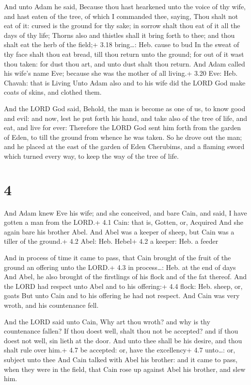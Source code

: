  And unto Adam he said, Because thou hast hearkened unto
the voice of thy wife, and hast eaten of the tree, of which I commanded
thee, saying, Thou shalt not eat of it: cursed is the ground for thy
sake; in sorrow shalt thou eat of it all the days of thy life;
 Thorns also and thistles shall it bring forth to thee; and
thou shalt eat the herb of the field;+ 3.18 bring\ldots: Heb. cause to
bud  In the sweat of thy face shalt thou eat bread, till
thou return unto the ground; for out of it wast thou taken: for dust
thou art, and unto dust shalt thou return.  And Adam called
his wife's name Eve; because she was the mother of all living.+ 3.20
Eve: Heb. Chavah: that is Living  Unto Adam also and to his
wife did the LORD God make coats of skins, and clothed them.

 And the LORD God said, Behold, the man is become as one
of us, to know good and evil: and now, lest he put forth his hand, and
take also of the tree of life, and eat, and live for ever: 
Therefore the LORD God sent him forth from the garden of Eden, to till
the ground from whence he was taken.  So he drove out the
man; and he placed at the east of the garden of Eden Cherubims, and a
flaming sword which turned every way, to keep the way of the tree of
life.

\hypertarget{section-3}{%
\section{4}\label{section-3}}

 And Adam knew Eve his wife; and she conceived, and bare
Cain, and said, I have gotten a man from the LORD.+ 4.1 Cain: that is,
Gotten, or, Acquired  And she again bare his brother Abel.
And Abel was a keeper of sheep, but Cain was a tiller of the ground.+
4.2 Abel: Heb. Hebel+ 4.2 a keeper: Heb. a feeder

 And in process of time it came to pass, that Cain brought
of the fruit of the ground an offering unto the LORD.+ 4.3 in
process\ldots: Heb. at the end of days  And Abel, he also
brought of the firstlings of his flock and of the fat thereof. And the
LORD had respect unto Abel and to his offering:+ 4.4 flock: Heb. sheep,
or, goats  But unto Cain and to his offering he had not
respect. And Cain was very wroth, and his countenance fell.

 And the LORD said unto Cain, Why art thou wroth? and why is
thy countenance fallen?  If thou doest well, shalt thou not
be accepted? and if thou doest not well, sin lieth at the door. And unto
thee shall be his desire, and thou shalt rule over him.+ 4.7 be
accepted: or, have the excellency+ 4.7 unto\ldots: or, subject unto thee
 And Cain talked with Abel his brother: and it came to pass,
when they were in the field, that Cain rose up against Abel his brother,
and slew him.

